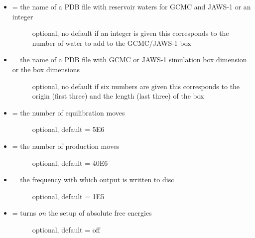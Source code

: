 \documentclass[letterpaper,10pt,english]{manual}
\begin{document}
\begin{itemize}
\begin{description}
\end{description}

\item {} \begin{description}
\item[{ = the name of a PDB file with reservoir waters for GCMC and JAWS-1 or an integer}] \leavevmode
optional, no default
if an integer is given this corresponds to the number of water to add to the GCMC/JAWS-1 box

\end{description}

\item {} \begin{description}
\item[{ = the name of a PDB file with GCMC or JAWS-1 simulation box dimension or the box dimensions}] \leavevmode
optional, no default
if six numbers are given this corresponds to the origin (first three) and the length (last three) of the box

\end{description}

\item {} \begin{description}
\item[{ = the number of equilibration moves}] \leavevmode
optional, default = 5E6

\end{description}

\item {} \begin{description}
\item[{ = the number of production moves}] \leavevmode
optional, default = 40E6

\end{description}

\item {} \begin{description}
\item[{ = the frequency with which output is written to disc}] \leavevmode
optional, default = 1E5

\end{description}

\item {} \begin{description}
\item[{ = turns \emph{on} the setup of absolute free energies}] \leavevmode
optional, default = off


\end{description}
\end{itemize}
\end{document}
